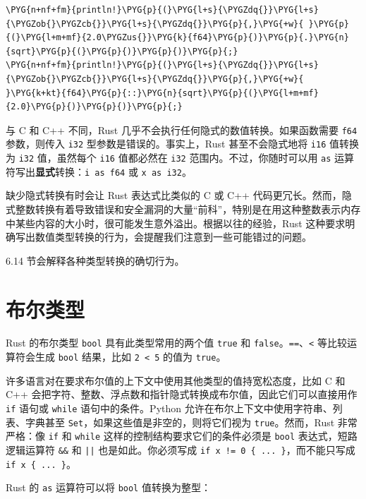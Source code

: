 \begin{Verbatim}[commandchars=\\\{\},breaklines=true,breakanywhere=true,fontsize=\codefont,xleftmargin=17bp]
\PYG{n+nf+fm}{println!}\PYG{p}{(}\PYG{l+s}{\PYGZdq{}}\PYG{l+s}{\PYGZob{}\PYGZcb{}}\PYG{l+s}{\PYGZdq{}}\PYG{p}{,}\PYG{+w}{ }\PYG{p}{(}\PYG{l+m+mf}{2.0\PYGZus{}}\PYG{k}{f64}\PYG{p}{)}\PYG{p}{.}\PYG{n}{sqrt}\PYG{p}{(}\PYG{p}{)}\PYG{p}{)}\PYG{p}{;}
\PYG{n+nf+fm}{println!}\PYG{p}{(}\PYG{l+s}{\PYGZdq{}}\PYG{l+s}{\PYGZob{}\PYGZcb{}}\PYG{l+s}{\PYGZdq{}}\PYG{p}{,}\PYG{+w}{ }\PYG{k+kt}{f64}\PYG{p}{::}\PYG{n}{sqrt}\PYG{p}{(}\PYG{l+m+mf}{2.0}\PYG{p}{)}\PYG{p}{)}\PYG{p}{;}
\end{Verbatim}

与 C 和 C++ 不同，Rust 几乎不会执行任何隐式的数值转换。如果函数需要 \texttt{f64} 参数，则传入 \texttt{i32} 型参数是错误的。事实上，Rust 甚至不会隐式地将 \texttt{i16} 值转换为 \texttt{i32} 值，虽然每个 \texttt{i16} 值都必然在 \texttt{i32} 范围内。不过，你随时可以用 \texttt{as} 运算符写出\textbf{显式}转换：\texttt{i as f64} 或 \texttt{x as i32}。

缺少隐式转换有时会让 Rust 表达式比类似的 C 或 C++ 代码更冗长。然而，隐式整数转换有着导致错误和安全漏洞的大量“前科”，特别是在用这种整数表示内存中某些内容的大小时，很可能发生意外溢出。根据以往的经验，Rust 这种要求明确写出数值类型转换的行为，会提醒我们注意到一些可能错过的问题。

6.14 节会解释各种类型转换的确切行为。

\section{布尔类型}

Rust 的布尔类型 \texttt{bool} 具有此类型常用的两个值 \texttt{true} 和 \texttt{false}。\texttt{==}、\texttt{<} 等比较运算符会生成 \texttt{bool} 结果，比如 \texttt{2 < 5} 的值为 \texttt{true}。

许多语言对在要求布尔值的上下文中使用其他类型的值持宽松态度，比如 C 和 C++ 会把字符、整数、浮点数和指针隐式转换成布尔值，因此它们可以直接用作 \texttt{if} 语句或 \texttt{while} 语句中的条件。Python 允许在布尔上下文中使用字符串、列表、字典甚至 \texttt{Set}，如果这些值是非空的，则将它们视为 \texttt{true}。然而，Rust 非常严格：像 \texttt{if} 和 \texttt{while} 这样的控制结构要求它们的条件必须是 \texttt{bool} 表达式，短路逻辑运算符 \texttt{\&\&} 和 \texttt{||} 也是如此。你必须写成 \texttt{if x != 0 \{ ... \}}，而不能只写成 \texttt{if x \{ ... \}}。

Rust 的 \texttt{as} 运算符可以将 \texttt{bool} 值转换为整型：

